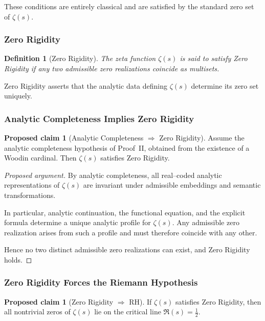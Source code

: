 \documentclass{article}
\newtheorem{definition}[theorem]{Definition}
\theoremstyle{definition}
\newtheorem{proposal}[theorem]{Proposed claim}
\begin{document}
These conditions are entirely classical and are satisfied by the standard
zero set of $\zeta(s)$.


\subsubsection{Zero Rigidity}

\begin{definition}[Zero Rigidity]
The zeta function $\zeta(s)$ is said to satisfy \emph{Zero Rigidity} if
any two admissible zero realizations coincide as multisets.
\end{definition}

Zero Rigidity asserts that the analytic data defining $\zeta(s)$ determine
its zero set uniquely.

\subsubsection{Analytic Completeness Implies Zero Rigidity}

\begin{proposal}[Analytic Completeness $\Rightarrow$ Zero Rigidity]
\label{thm:zero-rigidity}
Assume the analytic completeness hypothesis of Proof~II, obtained from the
existence of a Woodin cardinal.
Then $\zeta(s)$ satisfies Zero Rigidity.
\end{proposal}

\begin{proof}[Proposed argument]
By analytic completeness, all real--coded analytic representations of
$\zeta(s)$ are invariant under admissible embeddings and semantic
transformations.

In particular, analytic continuation, the functional equation, and the
explicit formula determine a unique analytic profile for $\zeta(s)$.
Any admissible zero realization arises from such a profile and must therefore
coincide with any other.

Hence no two distinct admissible zero realizations can exist, and Zero
Rigidity holds.
\end{proof}


\subsubsection{Zero Rigidity Forces the Riemann Hypothesis}

\begin{proposal}[Zero Rigidity $\Rightarrow$ RH]
\label{thm:zero-rigidity-implies-RH}
If $\zeta(s)$ satisfies Zero Rigidity, then all nontrivial zeros of
$\zeta(s)$ lie on the critical line $\Re(s)=\tfrac12$.
\end{proposal}
\end{document}
